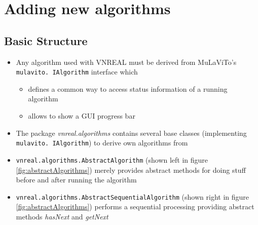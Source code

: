 \section{Adding new algorithms}

\subsection{Basic Structure}
\begin{itemize}
	\item Any algorithm used with VNREAL must be derived from MuLaViTo's \texttt{mulavito. IAlgorithm} interface which
	\begin{itemize}
		\item defines a common way to access status information of a running algorithm
		\item allows to show a GUI progress bar
	\end{itemize}
	\item The package \textit{vnreal.algorithms} contains several base classes (implementing \texttt{mulavito. IAlgorithm}) to derive own algorithms from
\item \texttt{vnreal.algorithms.AbstractAlgorithm} (shown left in figure \ref{fig:abstractAlgorithms}) merely provides abstract methods for doing stuff before and after running the algorithm 
\item \texttt{vnreal.algorithms.AbstractSequentialAlgorithm} (shown right in figure \ref{fig:abstractAlgorithms}) performs a sequential processing providing abstract methods \textsl{hasNext} and \textsl{getNext}
\begin{figure}[h]
  \begin{center}

\end{center}
\end{figure}
\end{itemize}
